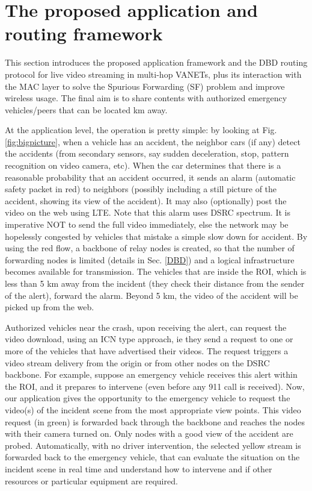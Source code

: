 \documentclass{sig-alternate-2013}
\begin{document}
\section{The proposed application and \\routing framework}
\label{proposal}

This section introduces the proposed application framework and the DBD routing protocol for live video streaming in multi-hop VANETs, plus its interaction with the MAC layer to solve the Spurious Forwarding (SF) problem and improve wireless usage. The final aim is to share contents with authorized emergency vehicles/peers that can be located km away.

At the application level, the operation is pretty simple: by looking at Fig. \ref{fig:bigpicture}, when a vehicle has an accident, the neighbor cars (if any) detect the accidents (from secondary sensors, say sudden deceleration, stop, pattern recognition on video camera, etc). When the car determines that there is a reasonable probability that an accident occurred, it sends an alarm (automatic safety packet in red) to neighbors (possibly including a still picture of the accident, showing its view of the accident). It may also (optionally) post the video on the web using LTE. Note that this alarm uses DSRC spectrum. It is imperative NOT to send the full video immediately, else the network may be hopelessly congested by vehicles that mistake a simple slow down for accident. By using the red flow, a backbone of relay nodes is created, so that the number of forwarding nodes is limited (details in Sec. \ref{DBD}) and a logical infrastructure becomes available for transmission. The vehicles that are inside the ROI, which is less than 5 km away from the incident (they check their distance from the sender of the alert), forward the alarm. Beyond 5 km, the video of the accident will be picked up from the web.

Authorized vehicles near the crash, upon receiving the alert, can request the video download, using an ICN type approach, ie they send a request to one or more of the vehicles that have advertised their videos. The request triggers a video stream delivery from the origin or from other nodes on the DSRC backbone. For example, suppose an emergency vehicle receives this alert within the ROI, and it prepares to intervene (even before  any 911 call is received). Now, our application gives the opportunity to the emergency vehicle to request the video(s) of the incident scene from the most appropriate view points. This video request (in green) is forwarded back through the backbone
and reaches the nodes with their camera turned on.
Only nodes with a good view of the accident are probed. Automatically, with no driver intervention, the selected
yellow stream is forwarded back to the emergency vehicle, that can evaluate the situation on the incident
scene in real time and understand how to intervene and if other resources or particular equipment are required.
\end{document}
